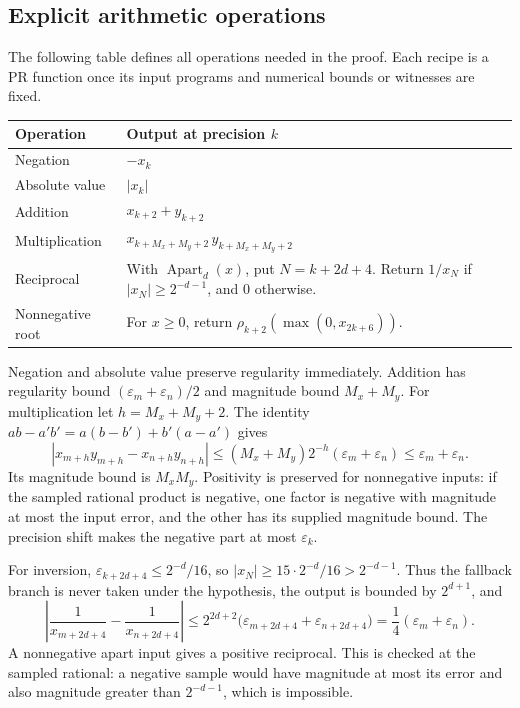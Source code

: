 \documentclass[11pt,a4paper]{article}
\theoremstyle{definition}
\newcommand{\eps}{\varepsilon}
\newcommand{\abs}[1]{\left|#1\right|}
\newcommand{\rhoq}[2]{\rho_{#1}\!\left(#2\right)}
\newcommand{\Apart}{\operatorname{Apart}}
\numberwithin{equation}{section}
\begin{document}
\subsection{Explicit arithmetic operations}

The following table defines all operations needed in the proof.
Each recipe is a PR function once its input programs and numerical
bounds or witnesses are fixed.

\begin{center}
\renewcommand{\arraystretch}{1.3}
\begin{tabular}{@{}p{25mm}p{104mm}@{}}
\toprule
Operation & Output at precision \(k\)\\
\midrule
Negation & \(-x_k\)\\
Absolute value & \(\abs{x_k}\)\\
Addition & \(x_{k+2}+y_{k+2}\)\\
Multiplication &
\(x_{k+M_x+M_y+2}\,y_{k+M_x+M_y+2}\)\\
Reciprocal &
With \(\Apart_d(x)\), put \(N=k+2d+4\).
Return \(1/x_N\) if \(\abs{x_N}\ge2^{-d-1}\), and \(0\) otherwise.\\
Nonnegative root &
For \(x\ge0\), return
\(\rhoq{k+2}{\max(0,x_{2k+6})}\).\\
\bottomrule
\end{tabular}
\end{center}

Negation and absolute value preserve regularity immediately. Addition
has regularity bound \((\eps_m+\eps_n)/2\) and magnitude bound
\(M_x+M_y\). For multiplication let \(h=M_x+M_y+2\). The identity
\(ab-a'b'=a(b-b')+b'(a-a')\) gives
\[
 \abs{x_{m+h}y_{m+h}-x_{n+h}y_{n+h}}
 \le(M_x+M_y)2^{-h}(\eps_m+\eps_n)
 \le\eps_m+\eps_n.
 \tag{3.6}
\]
Its magnitude bound is \(M_xM_y\). Positivity is preserved for
nonnegative inputs: if the sampled rational product is negative,
one factor is negative with magnitude at most the input error, and
the other has its supplied magnitude bound. The precision shift
makes the negative part at most \(\eps_k\).

For inversion, \(\eps_{k+2d+4}\le2^{-d}/16\), so
\(\abs{x_N}\ge15\cdot2^{-d}/16>2^{-d-1}\).
Thus the fallback branch is never taken under the hypothesis, the
output is bounded by \(2^{d+1}\), and
\[
 \abs{\frac1{x_{m+2d+4}}-\frac1{x_{n+2d+4}}}
 \le2^{2d+2}
   \bigl(\eps_{m+2d+4}+\eps_{n+2d+4}\bigr)
 =\frac14(\eps_m+\eps_n).
 \tag{3.7}\label{eq:inverse-regular}
\]
A nonnegative apart input gives a positive reciprocal. This is checked
at the sampled rational: a negative sample would have magnitude at
most its error and also magnitude greater than \(2^{-d-1}\), which is
impossible.
\end{document}
